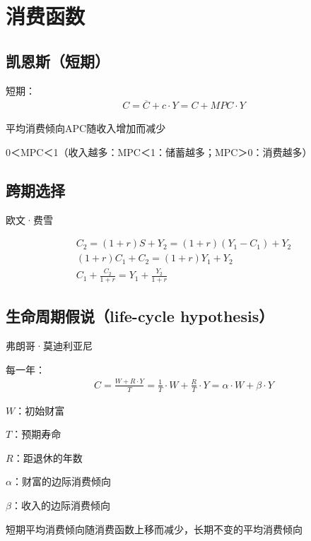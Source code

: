 \documentclass[12pt]{book}
\begin{document}
\section{消费函数}


\subsection{凯恩斯（短期）}

短期：
\begin{gather*}
  C = \overline{C} +  c\cdot Y = C + MPC\cdot Y
\end{gather*}


\par 平均消费倾向APC随收入增加而减少
\par 0＜MPC＜1（收入越多：MPC＜1：储蓄越多；MPC＞0：消费越多）


\subsection{跨期选择}

欧文·费雪

\begin{gather*}
C_2=\left(1+r\right)S+Y_2=\left(1+r\right)\left(Y_1-C_1\right)+Y_2\\
\left(1+r\right)C_1+C_2=\left(1+r\right)Y_1+Y_2\\
C_1+\frac{C_2}{1+r}=Y_1+\frac{Y_2}{1+r}
\end{gather*}


\subsection{生命周期假说（life-cycle hypothesis）}

弗朗哥·莫迪利亚尼


每一年：
\begin{gather*}
C=\frac{W+R·Y}{T}
=\frac{1}{T}·W+\frac{R}{T}·Y
=\alpha·W+\beta·Y
\end{gather*}
\par $W$：初始财富
\par $T$：预期寿命
\par $R$：距退休的年数
\par $\alpha$：财富的边际消费倾向
\par $\beta$：收入的边际消费倾向



\par 短期平均消费倾向随消费函数上移而减少，长期不变的平均消费倾向
\end{document}
